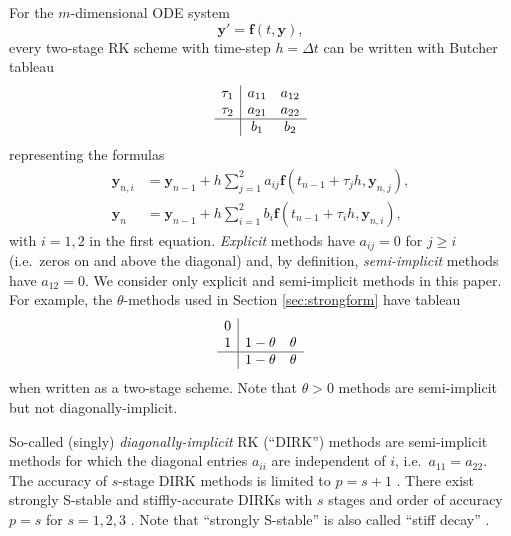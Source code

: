 \documentclass[final,leqno,onefignum,onetabnum]{siamltex1213bueler}
\newcommand\bbf{\mathbf{f}}
\newcommand\by{\mathbf{y}}
\begin{document}
For the $m$-dimensional ODE system
\begin{equation}
  \by' = \bbf(t,\by),  \label{eq:abstractODE}
\end{equation}
every two-stage RK scheme with time-step $h=\Delta t$ can be written with Butcher tableau \cite{AscherPetzold}
\begin{equation}
\begin{array}{c|cc}
\tau_1 & a_{11} & a_{12}  \\
\tau_2 & a_{21} & a_{22}  \\ \hline
       & b_1    & b_2     \\
\end{array}  \label{eq:tableau}
\end{equation}
representing the formulas
\begin{align*}
  \by_{n,i} &= \by_{n-1} + h \sum_{j=1}^2 a_{ij} \bbf(t_{n-1} + \tau_j h, \by_{n,j}), \\
      \by_n &= \by_{n-1} + h \sum_{i=1}^2 b_i \bbf(t_{n-1} + \tau_i h, \by_{n,i}),
\end{align*}
with $i=1,2$ in the first equation.  \emph{Explicit} methods have $a_{ij}=0$ for $j\ge i$ (i.e.~zeros on and above the diagonal) and, by definition, \emph{semi-implicit} methods have $a_{12}=0$.  We consider only explicit and semi-implicit methods in this paper.  For example, the $\theta$-methods used in Section \ref{sec:strongform} have tableau
\begin{equation*}
\begin{array}{c|cc}
0 &          &   \\
1 & 1-\theta & \theta  \\ \hline
  & 1-\theta & \theta  \\
\end{array}
\end{equation*}
when written as a two-stage scheme.  Note that $\theta>0$ methods are semi-implicit but not diagonally-implicit.

So-called (singly) \emph{diagonally-implicit} RK (``DIRK'') methods are semi-implicit methods for which the diagonal entries $a_{ii}$ are independent of $i$, i.e.~$a_{11}=a_{22}$.  The accuracy of $s$-stage DIRK methods is limited to $p=s+1$ \cite{AscherPetzold}.  There exist strongly S-stable and stiffly-accurate \cite{AscherPetzold} DIRKs with $s$ stages and order of accuracy $p=s$ for $s=1,2,3$ \cite{Alexander1977}.  Note that ``strongly S-stable'' is also called ``stiff decay'' \cite{AscherPetzold}.
\end{document}
